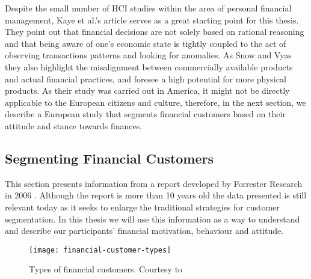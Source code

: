 Despite the small number of HCI studies within the area of personal financial management, Kaye et al.’s article serves as a great starting point for this thesis. They point out that financial decisions are not solely based on rational reasoning and that being aware of one’s economic state is tightly coupled to the act of observing transactions patterns and looking for anomalies. As Snow and Vyas \cite{snow2015fixing} they also highlight the misalignment between commercially available products and actual financial practices, and foresee a high potential for more physical products. As their study was carried out in America, it might not be directly applicable to the European citizens and culture, therefore, in the next section, we describe a European study that segments financial customers based on their attitude and stance towards finances.

\subsection{Segmenting Financial Customers}
\label{sec:segmenting-financial-customers}
This section presents information from a report developed by Forrester Research in 2006 \cite{ensor2006segmenting}. Although the report is more than 10 years old the data presented is still relevant today as it seeks to enlarge the traditional strategies for customer segmentation. In this thesis we will use this information as a way to understand and describe our participants’ financial motivation, behaviour and attitude.

\begin{figure}[h]
	\centering
	\texttt{[image: financial-customer-types]}
	\caption{Types of financial customers. Courtesy to \cite{ensor2006segmenting}}
	\label{fig:financial-customer-types}
\end{figure}

